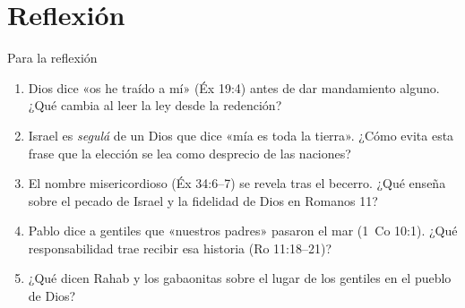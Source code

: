 \section{Reflexión}
\begin{frame}{Para la reflexión}
\footnotesize
\begin{enumerate}\setlength{\itemsep}{6pt}
\item Dios dice «os he traído a mí» (Éx 19:4) antes de dar mandamiento alguno. ¿Qué cambia al leer la ley desde la redención?
\item Israel es \emph{segulá} de un Dios que dice «mía es toda la tierra». ¿Cómo evita esta frase que la elección se lea como desprecio de las naciones?
\item El nombre misericordioso (Éx 34:6--7) se revela tras el becerro. ¿Qué enseña sobre el pecado de Israel y la fidelidad de Dios en Romanos 11?
\item Pablo dice a gentiles que «nuestros padres» pasaron el mar (1~Co 10:1). ¿Qué responsabilidad trae recibir esa historia (Ro 11:18--21)?
\item ¿Qué dicen Rahab y los gabaonitas sobre el lugar de los gentiles en el pueblo de Dios?
\end{enumerate}
\end{frame}

